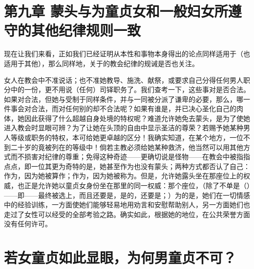 
\section{第九章 蒙头与为童贞女和一般妇女所遵守的其他纪律规则一致}

现在让我们来看，正如我们已经证明从本性和事物本身得出的论点同样适用于（也适用于其他），那么同样地，关于的教会纪律的规诫是否也关注。\par

女人在教会中不准说话；也不准她教导、施洗、献祭，或要求自己分得任何男人职分中的一份，更不用说（任何）司铎职务了。我们查考一下，这些事对是否合法。如果对合法，但她与受制于同样条件，并与一同被分派了谦卑的必要，那么，哪一件事会对合法，而对任何别的却不合法呢？如果有谁是，并已决心圣化自己的肉体，她因此获得了什么超越自身处境的特权呢？难道允许她免去蒙头，是为了使她进入教会时显眼可辨？为了让她在头顶的自由中显示圣洁的尊荣？若赐予她某种男人等级或职务的特权，本可给她更卓越的区分！我确实知道，在某个地方，一位不到二十岁的竟被列在的等级中！倘若主教必须给她某种救济，他当然可以用其他方式而不损害对纪律的尊重；免得这种奇迹——更确切说是怪物——在教会中被指指点点，即一位其更为奇特的是，她甚至作为也没有蒙头；两种方式都否认了自己：作为，因为她被算作；作为，因为她被称为。但是，允许她露头坐在那座位上的权威，也正是允许她以童贞女身份坐在那里的同一权威：那个座位，（除了不单是（）——即——最终被选上，而且还要是，是的，还要是；）为的是，她们在一切情感中的经验训练，一方面使她们能够轻易地用劝言和安慰帮助别人，另一方面她们也走过了女性可以经受的全部考验之路。确实如此，根据她的地位，在公共荣誉方面没有任何许可。\par


\section{若女童贞如此显眼，为何男童贞不可？}

